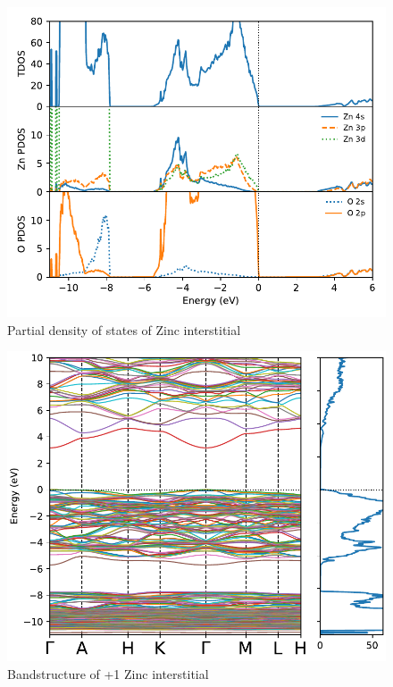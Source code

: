 \begin{figure}[tbh!]
	\centering
	\includegraphics[width=0.6\linewidth]{"images/rnd/dos-pdos_Zn_i"}
	\caption[Partial density of states of Zinc interstitial]{Partial density of states of Zinc interstitial}
\end{figure}


\begin{figure}[tbh!]
	\centering
	\includegraphics[width=0.6\linewidth]{"images/rnd/band-dos_Zn_i-p1"}
	\caption[Bandstructure of +1 Zinc interstitial]{Bandstructure of +1 Zinc interstitial}
\end{figure}

